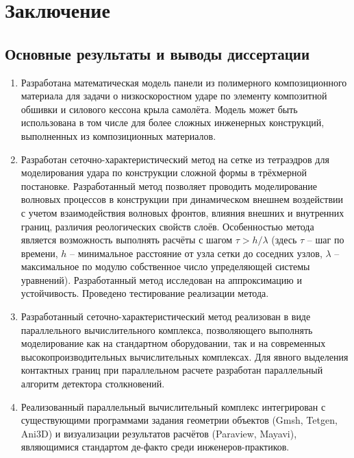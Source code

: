 \section*{Заключение}

\subsection*{Основные результаты и выводы диссертации}

\begin{enumerate}

\item Разработана математическая модель панели из полимерного композиционного материала для задачи о низкоскоростном ударе по элементу композитной обшивки и силового кессона крыла самолёта. Модель может быть использована в том числе для более сложных инженерных конструкций, выполненных из композиционных материалов.

\item Разработан сеточно-характеристический метод на сетке из тетраэдров для моделирования удара по конструкции сложной формы в трёхмерной постановке. Разработанный метод позволяет проводить моделирование волновых процессов в конструкции при динамическом внешнем воздействии с учетом взаимодействия волновых фронтов, влияния внешних и внутренних границ, различия реологических свойств слоёв. Особенностью метода является возможность выполнять расчёты с шагом $\tau > h / \lambda$ (здесь $\tau$ -- шаг по времени, $h$ -- минимальное расстояние от узла сетки до соседних узлов, $\lambda$ -- максимальное по модулю собственное число упределяющей системы уравнений). Разработанный метод исследован на аппроксимацию и устойчивость. Проведено тестирование реализации метода.

\item Разработанный сеточно-характеристический метод реализован в виде параллельного вычислительного комплекса, позволяющего выполнять моделирование как на стандартном оборудовании, так и на современных высокопроизводительных вычислительных комплексах. Для явного выделения контактных границ при параллельном расчете разработан параллельный алгоритм детектора столкновений.

\item Реализованный параллельный вычислительный комплекс интегрирован с существующими программами задания геометрии объектов (Gmsh, Tetgen, Ani3D) и визуализации результатов расчётов (Paraview, Mayavi), являющимися стандартом де-факто среди инженеров-практиков.


\end{enumerate}
